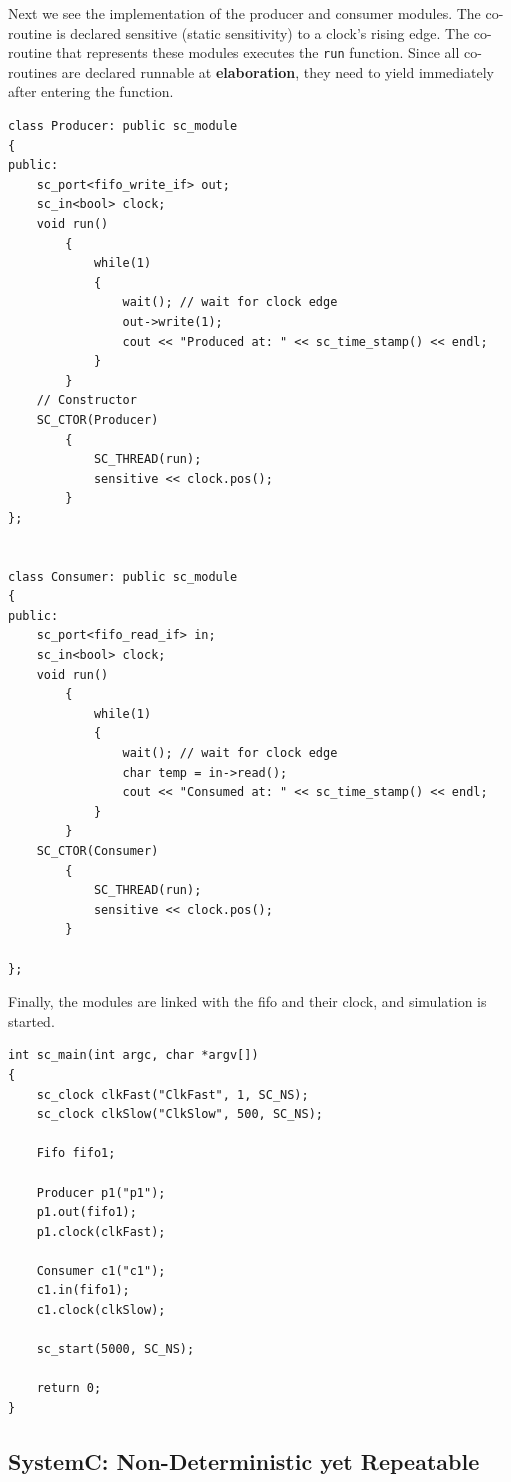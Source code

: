 \documentclass[11pt]{article}
\begin{document}
Next we see the implementation of the producer and consumer modules.
The co-routine is declared sensitive (static sensitivity) to a clock's rising edge.
The co-routine that represents these modules executes the \texttt{run} function.
Since all co-routines are declared runnable at \textbf{elaboration}, 
they need to yield immediately after entering the function.
\begin{verbatim}
class Producer: public sc_module
{
public:
    sc_port<fifo_write_if> out;
    sc_in<bool> clock;
    void run()
        {
            while(1)
            {
                wait(); // wait for clock edge
                out->write(1);
                cout << "Produced at: " << sc_time_stamp() << endl;
            }
        }
    // Constructor
    SC_CTOR(Producer)
        {
            SC_THREAD(run);
            sensitive << clock.pos();
        }
};


class Consumer: public sc_module
{
public:
    sc_port<fifo_read_if> in;
    sc_in<bool> clock;
    void run()
        {
            while(1)
            {
                wait(); // wait for clock edge
                char temp = in->read();
                cout << "Consumed at: " << sc_time_stamp() << endl;
            }
        }
    SC_CTOR(Consumer)
        {
            SC_THREAD(run);
            sensitive << clock.pos();
        }

};
\end{verbatim}

Finally, the modules are linked with the fifo and their clock, and simulation is started.
\begin{verbatim}
int sc_main(int argc, char *argv[])
{
    sc_clock clkFast("ClkFast", 1, SC_NS);
    sc_clock clkSlow("ClkSlow", 500, SC_NS);

    Fifo fifo1;

    Producer p1("p1");
    p1.out(fifo1);
    p1.clock(clkFast);

    Consumer c1("c1");
    c1.in(fifo1);
    c1.clock(clkSlow);

    sc_start(5000, SC_NS);

    return 0;
}
\end{verbatim}

\subsection{SystemC: Non-Deterministic yet Repeatable}
\label{AppendixB}
\end{document}
